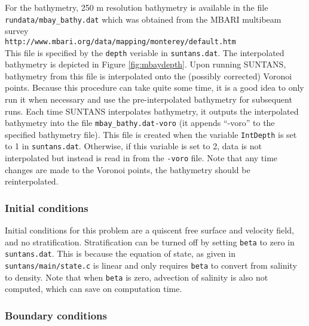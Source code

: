 For the bathymetry, 250 m resolution bathymetry is available in the file \\
\verb+rundata/mbay_bathy.dat+ which was obtained from the MBARI multibeam survey \\
\verb+http://www.mbari.org/data/mapping/monterey/default.htm+\\
This file is specified by the \verb+depth+ veriable in \verb+suntans.dat+.
The interpolated bathymetry is depicted in Figure \ref{fig:mbaydepth}.
Upon running SUNTANS, bathymetry from this file is interpolated onto the (possibly corrected) Voronoi points.
Because this procedure can take quite some time, it is a good idea to only run it when necessary and use
the pre-interpolated bathymetry for subsequent runs.  Each time SUNTANS interpolates bathymetry, it outputs
the interpolated bathymetry into the file \verb+mbay_bathy.dat-voro+ (it appends ``-voro'' to the specified
bathymetry file).  This file is created when the variable \verb+IntDepth+ is set to 1 in \verb+suntans.dat+.
Otherwise, if this variable is set to 2, data is not interpolated but instead is read in from the \verb+-voro+ file.
Note that any time changes are made to the Voronoi points, the bathymetry should be reinterpolated. 

\subsubsection{Initial conditions}

Initial conditions for this problem are a quiscent free surface and velocity field, and no stratification.  
Stratification can be turned off by setting \verb+beta+ to zero in \verb+suntans.dat+.  This is because the equation
of state, as given in \verb+suntans/main/state.c+ is linear and only requires \verb+beta+ to convert from
salinity to density.  Note that when \verb+beta+ is zero, advection of salinity is also not computed, which can
save on computation time.

\subsubsection{Boundary conditions} \label{sec:tides_bc}

